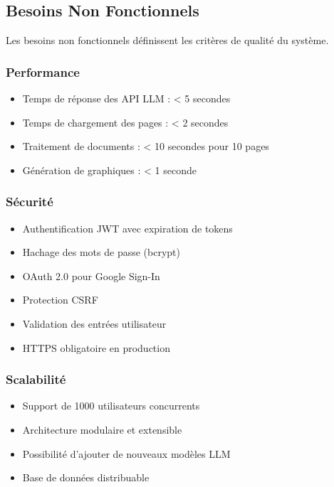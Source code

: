 \subsection{Besoins Non Fonctionnels}

Les besoins non fonctionnels définissent les critères de qualité du système.

\subsubsection{Performance}

\begin{itemize}
    \item Temps de réponse des API LLM : < 5 secondes
    \item Temps de chargement des pages : < 2 secondes
    \item Traitement de documents : < 10 secondes pour 10 pages
    \item Génération de graphiques : < 1 seconde
\end{itemize}

\subsubsection{Sécurité}

\begin{itemize}
    \item Authentification JWT avec expiration de tokens
    \item Hachage des mots de passe (bcrypt)
    \item OAuth 2.0 pour Google Sign-In
    \item Protection CSRF
    \item Validation des entrées utilisateur
    \item HTTPS obligatoire en production
\end{itemize}

\subsubsection{Scalabilité}

\begin{itemize}
    \item Support de 1000 utilisateurs concurrents
    \item Architecture modulaire et extensible
    \item Possibilité d'ajouter de nouveaux modèles LLM
    \item Base de données distribuable
\end{itemize}

